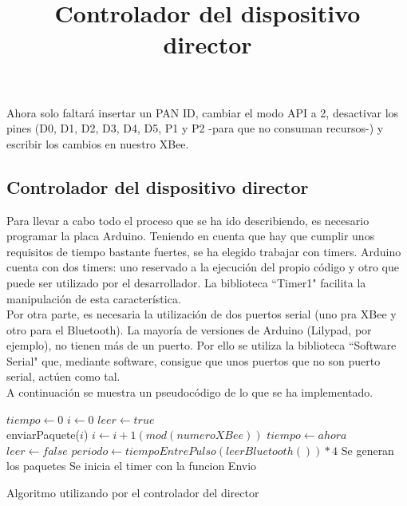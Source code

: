 Ahora solo faltará insertar un PAN ID, cambiar el modo API a 2, desactivar los pines (D0, D1, D2, D3, D4, D5, P1 y P2
-para que no consuman recursos-) y escribir los cambios en nuestro XBee.\\


\subsection{Controlador del dispositivo director}
\title{Controlador del dispositivo director}

Para llevar a cabo todo el proceso que se ha ido describiendo, es necesario programar
la placa Arduino. Teniendo en cuenta que hay que cumplir unos requisitos de tiempo bastante
fuertes, se ha elegido trabajar con timers. Arduino cuenta con dos timers: uno reservado
a la ejecución del propio código y otro que puede ser utilizado por el desarrollador.
La biblioteca ``Timer1" \cite{timeronearduino} facilita la manipulación de esta característica.\\

Por otra parte, es necesaria la utilización de dos puertos serial (uno pra XBee y otro para el Bluetooth).
La mayoría de versiones de Arduino (Lilypad, por ejemplo), no tienen más de un puerto.
Por ello se utiliza la biblioteca ``Software Serial" \cite{softwareserial} que, mediante software, consigue
que unos puertos que no son puerto serial, actúen como tal.\\

A continuación se muestra un pseudocódigo de lo que se ha implementado.
\begin{algorithm}
  \begin{algorithmic}[1]
     \State $tiempo\gets 0$
     \State $i\gets 0$
     \State $leer \gets true$\\

        \State enviarPaquete($i$)
        \State $i \gets i+1(mod(numeroXBee))$
        \State $tiempo \gets ahora$
      \EndIf
      \EndFunction\\

        \State $leer \gets false$
        \State $periodo\gets tiempoEntrePulso(leerBluetooth())*4$
        \State Se generan los paquetes
        \State Se inicia el timer con la funcion Envio
      \EndIf
     \EndIf
    \EndWhile
  \end{algorithmic}
  \caption{Algoritmo utilizando por el controlador del director}
\end{algorithm}


